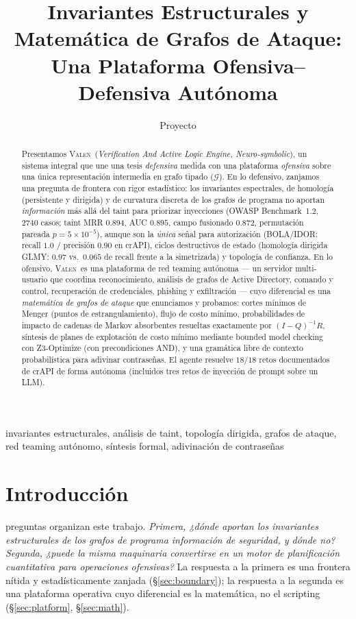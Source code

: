 \documentclass[journal]{IEEEtran}
\title{Invariantes Estructurales y Matemática de Grafos de Ataque:\\ Una Plataforma Ofensiva--Defensiva Autónoma}
\author{Proyecto \valen}
\newcommand{\valen}{\textsc{Valen}}
\newcommand{\IR}{\mathcal{G}}
\begin{document}
\maketitle

\begin{abstract}
Presentamos \valen\ (\emph{Verification And Active Logic Engine, Neuro-symbolic}),
un sistema integral que une una tesis \emph{defensiva} medida con una plataforma
\emph{ofensiva} sobre una única representación intermedia en grafo tipado
($\IR$). En lo defensivo, zanjamos una pregunta de frontera con rigor estadístico:
los invariantes espectrales, de homología (persistente y dirigida) y de curvatura
discreta de los grafos de programa no aportan \emph{información} más allá del
taint para priorizar inyecciones (OWASP Benchmark~1.2, $2740$ casos; taint MRR
$0.894$, AUC $0.895$, campo fusionado $0.872$, permutación pareada
$p=5\times10^{-5}$), aunque son la \emph{única} señal para autorización
(BOLA/IDOR: recall $1.0$ / precisión $0.90$ en crAPI), ciclos destructivos de
estado (homología dirigida GLMY: $0.97$ vs.\ $0.065$ de recall frente a la
simetrizada) y topología de confianza. En lo ofensivo, \valen\ es una plataforma
de red teaming autónoma --- un servidor multi-usuario que coordina reconocimiento,
análisis de grafos de Active Directory, comando y control, recuperación de
credenciales, phishing y exfiltración --- cuyo diferencial es una
\emph{matemática de grafos de ataque} que enunciamos y probamos: cortes mínimos de
Menger (puntos de estrangulamiento), flujo de costo mínimo, probabilidades de
impacto de cadenas de Markov absorbentes resueltas exactamente por
$(I-Q)^{-1}R$, síntesis de planes de explotación de costo mínimo mediante
bounded model checking con Z3-Optimize (con precondiciones AND), y una gramática
libre de contexto probabilística para adivinar contraseñas. El agente resuelve
$18/18$ retos documentados de crAPI de forma autónoma (incluidos tres retos de
inyección de prompt sobre un LLM).
\end{abstract}

\begin{IEEEkeywords}
invariantes estructurales, análisis de taint, topología dirigida, grafos de
ataque, red teaming autónomo, síntesis formal, adivinación de contraseñas
\end{IEEEkeywords}

\section{Introducción}
 preguntas organizan este trabajo. \emph{Primera, ¿dónde
aportan los invariantes estructurales de los grafos de programa información de
seguridad, y dónde no?} \emph{Segunda, ¿puede la misma maquinaria convertirse en
un motor de planificación cuantitativa para operaciones ofensivas?} La respuesta a
la primera es una frontera nítida y estadísticamente zanjada
(\S\ref{sec:boundary}); la respuesta a la segunda es una plataforma operativa cuyo
diferencial es la matemática, no el scripting (\S\ref{sec:platform},
\S\ref{sec:math}).
\end{document}
